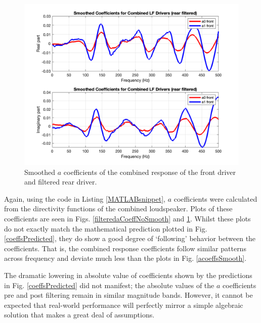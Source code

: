 \documentclass{report}
\begin{document}
            \begin{figure}[H]
                \centering
                \includegraphics[scale = 0.3]{figs/filteredaCoeffsSmoothed.png}
                \caption{Smoothed $a$ coefficients of the combined response of the front driver and filtered rear driver.}
                \label{filteredaCoeffsSmoothed}
            \end{figure}
            
            Again, using the code in Listing \ref{MATLABsnippet}, $a$ coefficients were calculated from the directivity functions of the combined loudspeaker.
            Plots of these coefficients are seen in Figs. \ref{filteredaCoeffNoSmooth} and \ref{filteredaCoeffsSmoothed}.
            Whilst these plots do not exactly match the mathematical prediction plotted in Fig. \ref{coeffsPredicted}, they do show a good degree of `following' behavior between the coefficients.
            That is, the combined response coefficients follow similar patterns across frequency and deviate much less than the plots in Fig. \ref{acoeffsSmooth}.

            The dramatic lowering in absolute value of coefficients shown by the predictions in Fig. \ref{coeffsPredicted} did not manifest; the absolute values of the $a$ coefficients pre and post filtering remain in similar magnitude bands.
            However, it cannot be expected that real-world performance will perfectly mirror a simple algebraic solution that makes a great deal of assumptions.
\end{document}
